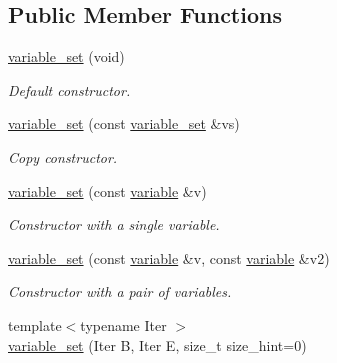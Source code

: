 \subsection*{Public Member Functions}
\begin{DoxyCompactItemize}
\item 
\hypertarget{classmerlin_1_1variable__set_a7fd347efce6f30df0344d20d466c0deb}{}\hyperlink{classmerlin_1_1variable__set_a7fd347efce6f30df0344d20d466c0deb}{variable\+\_\+set} (void)\label{classmerlin_1_1variable__set_a7fd347efce6f30df0344d20d466c0deb}

\begin{DoxyCompactList}\small\item\em Default constructor. \end{DoxyCompactList}\item 
\hypertarget{classmerlin_1_1variable__set_a877cc4b44d4c9ff4bc809fc896b8d879}{}\hyperlink{classmerlin_1_1variable__set_a877cc4b44d4c9ff4bc809fc896b8d879}{variable\+\_\+set} (const \hyperlink{classmerlin_1_1variable__set}{variable\+\_\+set} \&vs)\label{classmerlin_1_1variable__set_a877cc4b44d4c9ff4bc809fc896b8d879}

\begin{DoxyCompactList}\small\item\em Copy constructor. \end{DoxyCompactList}\item 
\hypertarget{classmerlin_1_1variable__set_ad89aea5338a27f742fe1e6289abe133e}{}\hyperlink{classmerlin_1_1variable__set_ad89aea5338a27f742fe1e6289abe133e}{variable\+\_\+set} (const \hyperlink{classmerlin_1_1variable}{variable} \&v)\label{classmerlin_1_1variable__set_ad89aea5338a27f742fe1e6289abe133e}

\begin{DoxyCompactList}\small\item\em Constructor with a single variable. \end{DoxyCompactList}\item 
\hypertarget{classmerlin_1_1variable__set_a38d633c846218d2afa0bcc62d72c13d6}{}\hyperlink{classmerlin_1_1variable__set_a38d633c846218d2afa0bcc62d72c13d6}{variable\+\_\+set} (const \hyperlink{classmerlin_1_1variable}{variable} \&v, const \hyperlink{classmerlin_1_1variable}{variable} \&v2)\label{classmerlin_1_1variable__set_a38d633c846218d2afa0bcc62d72c13d6}

\begin{DoxyCompactList}\small\item\em Constructor with a pair of variables. \end{DoxyCompactList}\item 
\hypertarget{classmerlin_1_1variable__set_a91672ff5a3b7711e032d9ac58332fce2}{}{\footnotesize template$<$typename Iter $>$ }\\\hyperlink{classmerlin_1_1variable__set_a91672ff5a3b7711e032d9ac58332fce2}{variable\+\_\+set} (Iter B, Iter E, size\+\_\+t size\+\_\+hint=0)\label{classmerlin_1_1variable__set_a91672ff5a3b7711e032d9ac58332fce2}


\end{DoxyCompactItemize}
